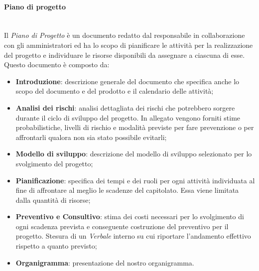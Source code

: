 \paragraph{Piano di progetto}\mbox{}\\ [1mm]
Il \textit{Piano di Progetto} è un documento redatto dal responsabile in collaborazione con gli amministratori ed ha lo scopo di pianificare le attività per la realizzazione del progetto e individuare le risorse disponibili da assegnare a ciascuna di esse.
Questo documento è composto da:
\begin{itemize}
	\item \textbf{Introduzione}: descrizione generale del documento che specifica anche lo scopo del documento e del prodotto e il calendario delle attività;
	\item \textbf{Analisi dei rischi}: analisi dettagliata dei rischi che potrebbero sorgere durante il ciclo di sviluppo del progetto\glo. In allegato vengono forniti stime probabilistiche, livelli di rischio e modalità previste per fare prevenzione o per affrontarli qualora non sia stato possibile evitarli;
	\item \textbf{Modello di sviluppo}: descrizione del modello di sviluppo selezionato per lo svolgimento del progetto\glo;
	\item \textbf{Pianificazione}: specifica dei tempi e dei ruoli per ogni attività individuata al fine di affrontare al meglio le scadenze del capitolato\glo. Essa viene limitata dalla quantità di risorse;
	\item \textbf{Preventivo e Consultivo}: stima dei costi necessari per lo svolgimento di ogni scadenza prevista e conseguente costruzione del preventivo per il progetto\glo. Stesura di un \textit{Verbale} interno su cui riportare l'andamento effettivo rispetto a quanto previsto;
	\item \textbf{Organigramma}: presentazione del nostro organigramma.
\end{itemize}
